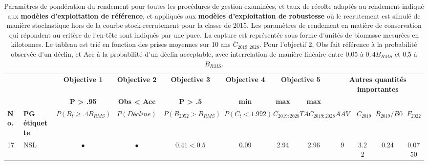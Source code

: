 \documentclass[11pt]{book}
\begin{document}
\begin{turn}
\begingroup\fontsize{7}{9}\selectfont
\begingroup\fontsize{7}{9}\selectfont
\begin{longtable}[t]{llcccccccccc}
\caption{\label{tab:unnamed-chunk-14}Paramètres de pondération du rendement pour toutes les procédures de gestion examinées, et taux de récolte adaptés au rendement indiqué aux \textbf{ modèles d’exploitation de référence}, et appliqués aux \textbf{modèles d’exploitation de robustesse} où le recrutement est simulé de manière stochastique hors de la courbe stock-recrutement pour la classe de 2015. Les paramètres de rendement en matière de conservation qui répondent au critère de l’en-tête sont indiqués par une puce. La capture est représentée sous forme d’unités de biomasse mesurées en kilotonnes. Le tableau est trié en fonction des prises moyennes sur 10 ans $\bar{C}_{2019:2028}$. Pour l’objectif 2, Obs fait référence à la probabilité observée d’un déclin, et Acc à la probabilité d’un déclin acceptable, avec interrelation de manière linéaire entre 0,05 à $0,4B_{RMS}$ et 0,5 à $B_{RMS}$.}\\
\toprule
\multicolumn{2}{c}{\textbf{ }} & \multicolumn{1}{c}{\textbf{Objective 1}} & \multicolumn{1}{c}{\textbf{Objective 2}} & \multicolumn{1}{c}{\textbf{Objective 3}} & \multicolumn{1}{c}{\textbf{Objective 4}} & \multicolumn{2}{c}{\textbf{Objective 5}} & \multicolumn{4}{c}{\textbf{Autres quantités importantes}} \\
\cmidrule(l{3pt}r{3pt}){3-3} \cmidrule(l{3pt}r{3pt}){4-4} \cmidrule(l{3pt}r{3pt}){5-5} \cmidrule(l{3pt}r{3pt}){6-6} \cmidrule(l{3pt}r{3pt}){7-8} \cmidrule(l{3pt}r{3pt}){9-12}
\multicolumn{2}{c}{\textbf{ }} & \multicolumn{1}{c}{\textbf{P > .95}} & \multicolumn{1}{c}{\textbf{Obs < Acc}} & \multicolumn{1}{c}{\textbf{P > .5}} & \multicolumn{1}{c}{\textbf{min}} & \multicolumn{1}{c}{\textbf{max}} & \multicolumn{1}{c}{\textbf{max}} & \multicolumn{4}{c}{\textbf{ }} \\
\cmidrule(l{3pt}r{3pt}){3-3} \cmidrule(l{3pt}r{3pt}){4-4} \cmidrule(l{3pt}r{3pt}){5-5} \cmidrule(l{3pt}r{3pt}){6-6} \cmidrule(l{3pt}r{3pt}){7-7} \cmidrule(l{3pt}r{3pt}){8-8}
\textbf{No.} & \textbf{PG étiquette} & \textbf{$P(B_t \geq .4B_{RMS})$} & \textbf{$P(Décline)$} & \textbf{$P(B_{2052} > B_{RMS})$} & \textbf{$P(C_t < 1.992)$} & \textbf{$\bar{C}_{2019:2028}$} & \textbf{$\bar{TAC}_{2019:2028}$} & \textbf{$AAV$} & \textbf{$C_{2019}$} & \textbf{$B_{2019}/B0$} & \textbf{$F_{2022}$}\\
\midrule
17 & NSL & $\bullet$ & $\bullet$ & $0.41<0.5$ & 0.09 & 2.94 & 2.96 & 9 & 3.22 & 0.24 & 0.0750\\

\end{longtable}
\end{turn}
\end{document}
